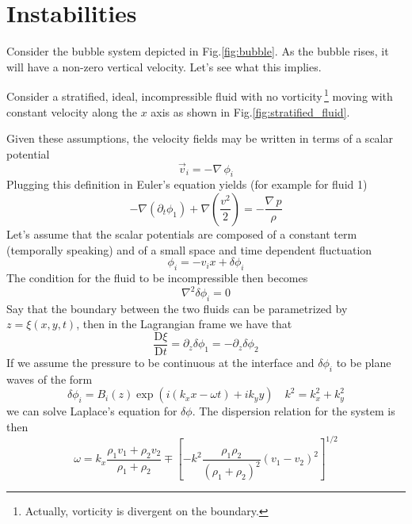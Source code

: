 \section{Instabilities}
Consider the bubble system depicted in Fig.\ref{fig:bubble}. As the bubble rises, it will have a non-zero vertical velocity. Let's see what this implies.
\par Consider a stratified, ideal, incompressible fluid with no vorticity\,\footnote{Actually, vorticity is divergent on the boundary.} moving with constant velocity along the $x$ axis as shown in Fig.\ref{fig:stratified_fluid}.

\par Given these assumptions, the velocity fields may be written in terms of a scalar potential
\begin{equation*}
    \vec{v}_{i} = -\nabla\,\phi_{i}
\end{equation*}
Plugging this definition in Euler's equation yields (for example for fluid 1)
\begin{equation*}
    -\nabla(\partial_{t}\phi_{1}) +\nabla\left(\frac{v^{2}}{2}\right) = -\frac{\nabla \,p}{\rho}
\end{equation*}
Let's assume that the scalar potentials are composed of a constant term (temporally speaking) and of a small space and time dependent fluctuation
\begin{equation*}
    \phi_{i} = -v_{i}x +\delta\phi_{i}
\end{equation*}
The condition for the fluid to be incompressible then becomes 
\begin{equation*}
    \nabla^{2}\delta\phi_{i} = 0
\end{equation*}
Say that the boundary between the two fluids can be parametrized by $z = \xi(x,y,t)$, then in the Lagrangian frame we have that 
\begin{equation*}
    \frac{\text{D}\xi}{\text{D}t} = \partial_{z}\delta\phi_{1} = -\partial_{z}\delta\phi_{2}
\end{equation*}
If we assume the pressure to be continuous at the interface and $\delta\phi_{i}$ to be plane waves of the form 
\begin{equation*}
    \delta\phi_{i} = B_{i}(z)\exp(i(k_{x}x-\omega t)+ik_{y}y) \quad k^{2} = k_{x}^{2}+k_{y}^{2}
\end{equation*}
we can solve Laplace's equation for $\delta\phi$. The dispersion relation for the system is then
\begin{equation}
    \omega = k_{x}\frac{\rho_{1}v_{1}+\rho_{2}v_{2}}{\rho_{1}+\rho_{2}} \mp \left[-k^{2}\frac{\rho_{1}\rho_{2}}{(\rho_{1}+\rho_{2})^{2}}(v_{1}-v_{2})^{2}\right]^{1/2}
    \label{eq:KHi}
\end{equation}
